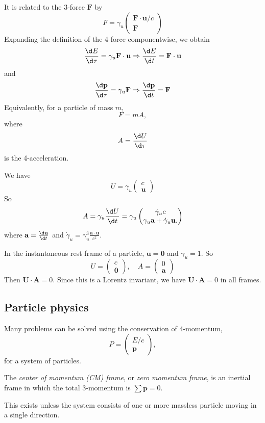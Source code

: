 \documentclass[a4paper]{article}
\begin{document}
It is related to the 3-force $\mathbf{F}$ by
\[
  F = \gamma_u
  \begin{pmatrix}
    \mathbf{F}\cdot \mathbf{u}/c\\
    \mathbf{F}
  \end{pmatrix}
\]
Expanding the definition of the 4-force componentwise, we obtain
\[
  \frac{\d E}{\d \tau} = \gamma_u \mathbf{F}\cdot \mathbf{u} \Rightarrow \frac{\d E}{\d t} = \mathbf{F}\cdot \mathbf{u}
\]
and
\[
  \frac{\d \mathbf{p}}{\d \tau} = \gamma_u \mathbf{F} \Rightarrow \frac{\d \mathbf{p}}{\d t} = \mathbf{F}
\]
Equivalently, for a particle of mass $m$,
\[
  F =mA,
\]
where
\[
  A = \frac{\d U}{\d \tau}
\]
is the 4-acceleration.

We have
\[
  U = \gamma_u
  \begin{pmatrix}
    c\\
    \mathbf{u}
  \end{pmatrix}
\]
So
\[
  A = \gamma_u \frac{\d U}{\d t} = \gamma_u
  \begin{pmatrix}
    \dot{\gamma}_u c\\
    \gamma_u \mathbf{a} + \dot{\gamma}_u \mathbf{u}.
  \end{pmatrix}
\]
where $\mathbf{\mathbf{a}} = \frac{\d \mathbf{u}}{\d t}$ and $\dot{\gamma}_u = \gamma_u^3 \frac{\mathbf{a}\cdot \mathbf{u}}{c^2}$.

In the instantaneous rest frame of a particle, $\mathbf{u} = \mathbf{0}$ and $\gamma_u = 1$. So
\[
  U =
  \begin{pmatrix}
    c\\
    \mathbf{0}
  \end{pmatrix}, \quad
  A =
  \begin{pmatrix}
    0\\
    \mathbf{a}
  \end{pmatrix}
\]
Then $\mathbf{U}\cdot \mathbf{A} = 0$. Since this is a Lorentz invariant, we have $\mathbf{U} \cdot \mathbf{A} = 0$ in all frames.

\subsection{Particle physics}
Many problems can be solved using the conservation of 4-momentum,
\[
  P =
  \begin{pmatrix}
    E/c\\
    \mathbf{p}
  \end{pmatrix},
\]
for a system of particles.
\begin{defi}
  The \emph{center of momentum (CM) frame}, or \emph{zero momentum frame}, is an inertial frame in which the total 3-momentum is $\sum \mathbf{p} = 0$.
\end{defi}
This exists unless the system consists of one or more massless particle moving in a single direction.
\end{document}
